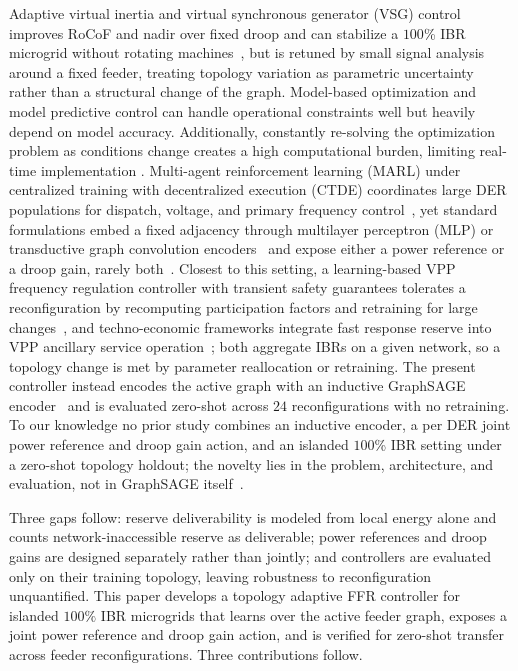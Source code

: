 \documentclass[lettersize,journal]{IEEEtran}
\begin{document}
	Adaptive virtual inertia and virtual synchronous generator (VSG) control improves RoCoF and nadir over fixed droop and can stabilize a $100$\% IBR microgrid without rotating machines~\cite{hamanah2024robust}, but is retuned by small signal analysis around a fixed feeder, treating topology variation as parametric uncertainty rather than a structural change of the graph. Model-based optimization and model predictive control can handle operational constraints well but heavily depend on model accuracy. Additionally, constantly re-solving the optimization problem as conditions change creates a high computational burden, limiting real-time implementation \cite{9044326}. Multi-agent reinforcement learning (MARL) under centralized training with decentralized execution (CTDE) coordinates large DER populations for dispatch, voltage, and primary frequency control~\cite{shi2025coordvpp,qiu2023hierarchical}, yet standard formulations embed a fixed adjacency through multilayer perceptron (MLP) or transductive graph convolution encoders~\cite{wang2025mappo,wang2023graphppo} and expose either a power reference or a droop gain, rarely both~\cite{hu2022multitimescale}. Closest to this setting, a learning-based VPP frequency regulation controller with transient safety guarantees tolerates a reconfiguration by recomputing participation factors and retraining for large changes~\cite{zhang2026vppsafety}, and techno-economic frameworks integrate fast response reserve into VPP ancillary service operation~\cite{fernandopulle2024vppffr}; both aggregate IBRs on a given network, so a topology change is met by parameter reallocation or retraining. The present controller instead encodes the active graph with an inductive GraphSAGE encoder~\cite{pei2023graphsage,CHEN2023930} and is evaluated zero-shot across $24$ reconfigurations with no retraining. To our knowledge no prior study combines an inductive encoder, a per DER joint power reference and droop gain action, and an islanded $100$\% IBR setting under a zero-shot topology holdout; the novelty lies in the problem, architecture, and evaluation, not in GraphSAGE itself~\cite{pei2023graphsage}.
	
	Three gaps follow: reserve deliverability is modeled from local energy alone and counts network-inaccessible reserve as deliverable; power references and droop gains are designed separately rather than jointly; and controllers are evaluated only on their training topology, leaving robustness to reconfiguration unquantified.
	This paper develops a topology adaptive FFR controller for islanded $100\%$ IBR microgrids that learns over the active feeder graph, exposes a joint power reference and droop gain action, and is verified for zero-shot transfer across feeder reconfigurations. Three contributions follow.
	
\end{document}

